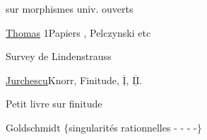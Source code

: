  sur morphismes univ. ouverts

\uline{Thomas} 1\qquad Papiers , Pelczynski etc

Survey de Lindenstrauss \unsure{---|--}

\uline{Jurchescu}\qquad Knorr, Finitude, $\overline{\underline{\mathrm I}}$, $\overline{\underline{\mathrm {II}}}$.

Petit livre sur finitude

Goldschmidt\qquad {} $\{$singularités rationnelles - - - -$\}$

\qquad {}

\clearpage
\normalmarginpar
